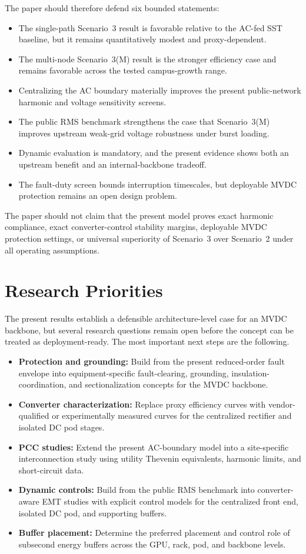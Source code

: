 \documentclass[11pt]{article}
\begin{document}
The paper should therefore defend six bounded statements:
\begin{itemize}
    \item The single-path Scenario~3 result is favorable relative to the AC-fed SST baseline, but it remains quantitatively modest and proxy-dependent.
    \item The multi-node Scenario~3(M) result is the stronger efficiency case and remains favorable across the tested campus-growth range.
    \item Centralizing the AC boundary materially improves the present public-network harmonic and voltage sensitivity screens.
    \item The public RMS benchmark strengthens the case that Scenario~3(M) improves upstream weak-grid voltage robustness under burst loading.
    \item Dynamic evaluation is mandatory, and the present evidence shows both an upstream benefit and an internal-backbone tradeoff.
    \item The fault-duty screen bounds interruption timescales, but deployable MVDC protection remains an open design problem.
\end{itemize}

The paper should not claim that the present model proves exact harmonic compliance, exact converter-control stability margins, deployable MVDC protection settings, or universal superiority of Scenario~3 over Scenario~2 under all operating assumptions.

\section{Research Priorities}
The present results establish a defensible architecture-level case for an MVDC backbone, but several research questions remain open before the concept can be treated as deployment-ready. The most important next steps are the following.

\begin{itemize}
    \item \textbf{Protection and grounding:} Build from the present reduced-order fault envelope into equipment-specific fault-clearing, grounding, insulation-coordination, and sectionalization concepts for the MVDC backbone.
    \item \textbf{Converter characterization:} Replace proxy efficiency curves with vendor-qualified or experimentally measured curves for the centralized rectifier and isolated DC pod stages.
    \item \textbf{PCC studies:} Extend the present AC-boundary model into a site-specific interconnection study using utility Thevenin equivalents, harmonic limits, and short-circuit data.
    \item \textbf{Dynamic controls:} Build from the public RMS benchmark into converter-aware EMT studies with explicit control models for the centralized front end, isolated DC pod, and supporting buffers.
    \item \textbf{Buffer placement:} Determine the preferred placement and control role of subsecond energy buffers across the GPU, rack, pod, and backbone levels.
\end{itemize}
\end{document}
